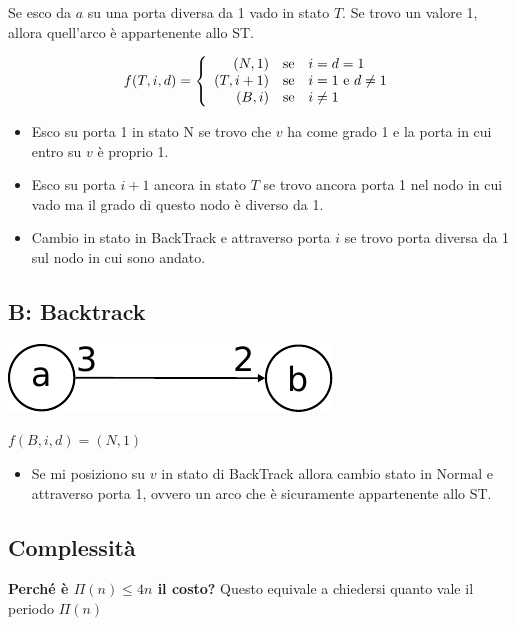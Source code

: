 Se esco da $a$ su una porta diversa da 1 vado in stato $T$. Se trovo un valore
1, allora quell'arco è appartenente allo ST.

\begin{equation}
    f(T,i,d) =
    \left\{
    \begin{array}{r
            @{\quad{\mbox{se}}\quad}
            l}
        (N,1)   & i = d = 1                   \\
        (T,i+1) & i = 1 ~\textrm{e}~ d \neq 1 \\
        (B,i)   & i \neq 1                    \\
    \end{array}
    \right.
\end{equation}
\begin{itemize}
    \item Esco su porta 1 in stato N se trovo che $v$ ha come grado 1 e la porta
          in cui entro su $v$ è proprio 1.
    \item Esco su porta $i+1$ ancora in stato $T$ se trovo ancora porta 1 nel nodo
          in cui vado ma il grado di questo nodo è diverso da 1.
    \item Cambio in stato in BackTrack e attraverso porta $i$ se trovo porta
          diversa da 1 sul nodo in cui sono andato.
\end{itemize}


\subsection{B: Backtrack}
\begin{center}
    \includegraphics[scale=0.7]{images/n_28-2}
\end{center}

\begin{center}
    $f(B,i,d) = (N,1)$
\end{center}

\begin{itemize}
    \item Se mi posiziono su $v$ in stato di BackTrack allora cambio stato in
          Normal e attraverso porta 1, ovvero un arco che è sicuramente appartenente
          allo ST.
\end{itemize}

\subsection{Complessità}
\textbf{Perché è $\Pi(n) \leq 4n$ il costo?} Questo equivale a chiedersi quanto
vale il periodo $\Pi(n)$\\

